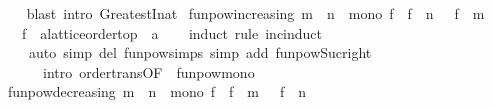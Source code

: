 \begin{isabellebody}
%
\isadelimproof
\ \ %
\endisadelimproof
%
\isatagproof
{}\isamarkupfalse%
\ {\isacharparenleft}{\kern0pt}blast\ intro{\isacharcolon}{\kern0pt}\ GreatestI{\isacharunderscore}{\kern0pt}nat{\isacharparenright}{\kern0pt}%
\endisatagproof
{\isafoldproof}%
%
\isadelimproof
%
\endisadelimproof
%
\isadelimdocument
%
\endisadelimdocument
%
\isatagdocument
%
\isamarkuptrue%
%
\endisatagdocument
{\isafolddocument}%
%
\isadelimdocument
%
\endisadelimdocument
{}\isamarkupfalse%
\ funpow{\isacharunderscore}{\kern0pt}increasing{\isacharcolon}{\kern0pt}\ {\isachardoublequoteopen}m\ {\isasymle}\ n\ {\isasymLongrightarrow}\ mono\ f\ {\isasymLongrightarrow}\ {\isacharparenleft}{\kern0pt}f\ {\isacharcircum}{\kern0pt}{\isacharcircum}{\kern0pt}\ n{\isacharparenright}{\kern0pt}\ {\isasymtop}\ {\isasymle}\ {\isacharparenleft}{\kern0pt}f\ {\isacharcircum}{\kern0pt}{\isacharcircum}{\kern0pt}\ m{\isacharparenright}{\kern0pt}\ {\isasymtop}{\isachardoublequoteclose}\isanewline
\ \ \ f\ {\isacharcolon}{\kern0pt}{\isacharcolon}{\kern0pt}\ {\isachardoublequoteopen}{\isacharprime}{\kern0pt}a{\isacharcolon}{\kern0pt}{\isacharcolon}{\kern0pt}{\isacharbraceleft}{\kern0pt}lattice{\isacharcomma}{\kern0pt}order{\isacharunderscore}{\kern0pt}top{\isacharbraceright}{\kern0pt}\ {\isasymRightarrow}\ {\isacharprime}{\kern0pt}a{\isachardoublequoteclose}\isanewline
%
\isadelimproof
\ \ %
\endisadelimproof
%
\isatagproof
{}\isamarkupfalse%
\ {\isacharparenleft}{\kern0pt}induct\ rule{\isacharcolon}{\kern0pt}\ inc{\isacharunderscore}{\kern0pt}induct{\isacharparenright}{\kern0pt}\isanewline
\ \ \ \ {\isacharparenleft}{\kern0pt}auto\ simp\ del{\isacharcolon}{\kern0pt}\ funpow{\isachardot}{\kern0pt}simps{\isacharparenleft}{\kern0pt}{}{\isacharparenright}{\kern0pt}\ simp\ add{\isacharcolon}{\kern0pt}\ funpow{\isacharunderscore}{\kern0pt}Suc{\isacharunderscore}{\kern0pt}right\isanewline
\ \ \ \ \ \ intro{\isacharcolon}{\kern0pt}\ order{\isacharunderscore}{\kern0pt}trans{\isacharbrackleft}{\kern0pt}OF\ {\isacharunderscore}{\kern0pt}\ funpow{\isacharunderscore}{\kern0pt}mono{\isacharbrackright}{\kern0pt}{\isacharparenright}{\kern0pt}%
\endisatagproof
{\isafoldproof}%
%
\isadelimproof
\isanewline
%
\endisadelimproof
\isanewline
{}\isamarkupfalse%
\ funpow{\isacharunderscore}{\kern0pt}decreasing{\isacharcolon}{\kern0pt}\ {\isachardoublequoteopen}m\ {\isasymle}\ n\ {\isasymLongrightarrow}\ mono\ f\ {\isasymLongrightarrow}\ {\isacharparenleft}{\kern0pt}f\ {\isacharcircum}{\kern0pt}{\isacharcircum}{\kern0pt}\ m{\isacharparenright}{\kern0pt}\ {\isasymbottom}\ {\isasymle}\ {\isacharparenleft}{\kern0pt}f\ {\isacharcircum}{\kern0pt}{\isacharcircum}{\kern0pt}\ n{\isacharparenright}{\kern0pt}\ {\isasymbottom}{\isachardoublequoteclose}\isanewline

\end{isabellebody}
